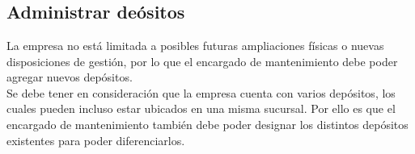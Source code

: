 \documentclass[a4paper, 12pt,twoside]{report}  %
\numberwithin{equation}{subsection} %
\begin{document}
\indent
\\\\\\\\\\\\\\\\\\\\\\\\\\\\\\\\\\\\\\\\
\pagebreak

\subsection*{Administrar deósitos}
La empresa no está limitada a posibles futuras ampliaciones físicas o nuevas disposiciones de gestión, por lo que el encargado de mantenimiento debe poder agregar nuevos depósitos.\\
\indent Se debe tener en consideración que la empresa cuenta con varios depósitos, los cuales pueden incluso estar ubicados en una misma sucursal. Por ello es que el encargado de mantenimiento también debe poder designar los distintos depósitos existentes para poder diferenciarlos.

\renewcommand{\arraystretch}{1.4}
\end{document}
